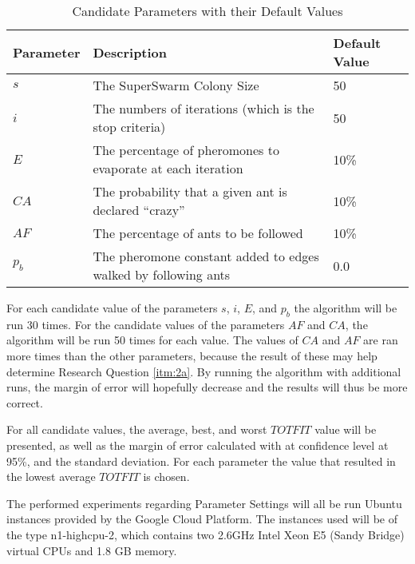 \begin{table}[H]
	\small
	\begin{tabular}{|l|l|l|}
    	\hline
    	Parameter & Description & Default Value\\
    	\hline
    	$s$ & The SuperSwarm Colony Size & 50\\
    	$i$ & The numbers of iterations (which is the stop criteria) & 50\\
    	$E$ & The percentage of pheromones to evaporate at each iteration & 10\%\\
    	$CA$ & The probability that a given ant is declared ``crazy'' & 10\%\\
    	$AF$ & The percentage of ants to be followed & 10\%\\
        $p_b$ & The pheromone constant added to edges walked by following ants & 0.0\\
   	    \hline
    \end{tabular}
    \caption {Candidate Parameters with their Default Values}
    \label{table:parameters}
\end{table}

For each candidate value of the parameters $s$, $i$, $E$, and $p_b$ the algorithm will be run 30 times.  For the candidate values of the parameters $AF$ and $CA$, the algorithm will be run 50 times for each value. 
The values of $CA$ and $AF$ are ran more times than the other parameters, because the result of these may help determine Research Question \vref{itm:2a}. By running the algorithm with additional runs, the margin of error will hopefully decrease and the results will thus be more correct.

For all candidate values, the average, best, and worst $TOTFIT$ value will be presented, as well as the margin of error calculated with at confidence level at 95\%, and the standard deviation. For each parameter the value that resulted in the lowest average $TOTFIT$ is chosen. 

The performed experiments regarding Parameter Settings will all be run Ubuntu instances provided by the Google Cloud Platform. The instances used will be of the type n1-highcpu-2, which contains two 2.6GHz Intel Xeon E5 (Sandy Bridge) virtual CPUs and 1.8 GB memory\cite{website:google}.  

